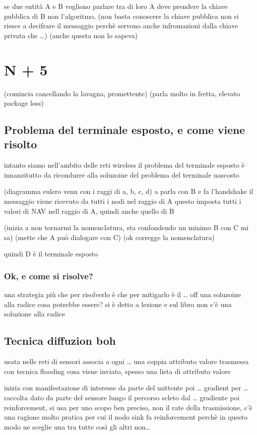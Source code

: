 \documentclass[11pt]{article}
\begin{document}
se due entità A e B vogliono parlare tra di loro A deve prendere la chiave pubblica di B
non l'algoritmo,
(non basta conoscere la chiave pubblica non si riesce a decifrare il messaggio perchè servono anche infromazioni dalla chiave privata che \ldots{})
(anche questa non lo sapeva)

\section{N + 5}
\label{sec:org7bb367d}
(comincia cancellando la lavagna, promettente)
(parla molto in fretta, elevato package loss)
\subsection{Problema del terminale esposto, e come viene risolto}
\label{sec:org749eb6e}
intanto siamo nell'ambito delle reti wireless
il problema del terminale esposto è innanzitutto da ricondurre alla soluzoine del problema del terminale nascosto

(diagramma eulero venn con i raggi di a, b, c, d)
a parla con B e fa l'handshake
il messaggio viene ricevuto da tutti i nodi nel raggio di A
questo imposta tutti i valori di NAV nell raggio di A, quindi anche quello di B

(inizia a non tornarmi la nomenclatura, sta confondendo un minimo B con C mi sa)
(mette che A può dialogare con C)
(ok corregge la nomenclatura)

quindi D è il terminale esposto

\subsubsection{Ok, e come si risolve?}
\label{sec:org274b52b}
una strategia più che per risolverlo è che per mitigarlo è il \ldots{} off
una soluzoine alla radice cosa potrebbe essere? si è detto a lezione e sul libro
non c'è una soluzione alla radice

\subsection{Tecnica diffuzion boh}
\label{sec:orgb6bee01}
usata nelle reti di sensori
associa a ogni \ldots{} una coppia attributo valore
trasmessa con tecnica flooding
cosa viene inviato, spesso una lista di attributo valore

inizia con manifestazione di interesse da parte del mittente
poi \ldots{} gradient per \ldots{}
raccolta dato da parte del sensore lungo il percorso scleto dal \ldots{} gradiente
poi reinforcement, si usa per uno scopo ben preciso, non il rate della trasmissione, c'è una ragione molto pratica per cui il nodo sink fa reinforcement
perchè in questo modo ne sceglie una tra tutte così gli altri non\ldots{}
\end{document}
